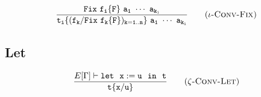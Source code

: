 \begin{equation*}
\frac{\tt Fix\ f_i\{F\}\ a_1\ \cdots\ a_{k_i}}
    {\tt t_i\{(f_k/Fix\ f_k\{F\})_{k=1..n}\}\ a_1\ \cdots\ a_{k_i}}
    \tag{\sc $\iota$-Conv-Fix}
\end{equation*}

\subsection{Let}

\begin{Def}
\begin{equation*}
\frac{E[\Gamma]\vdash \tt let\ \ x:=u\ \ in\ \ t}
    {\tt t\{x/u\}}
    \tag{\sc $\zeta$-Conv-Let}
\end{equation*}
\end{Def}
